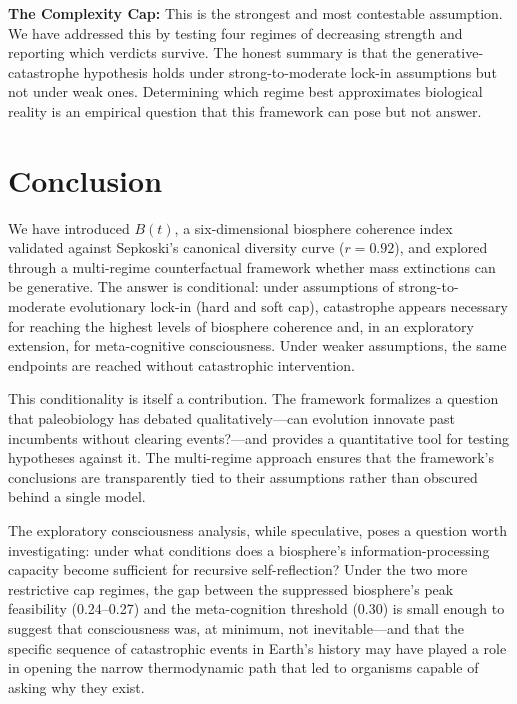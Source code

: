 \documentclass[10pt,letterpaper]{article}
\newcommand{\bt}{$B(t)$}
\begin{document}
\textbf{The Complexity Cap:} This is the strongest and most contestable
assumption. We have addressed this by testing four regimes of decreasing
strength and reporting which verdicts survive. The honest summary is that
the generative-catastrophe hypothesis holds under strong-to-moderate lock-in
assumptions but not under weak ones. Determining which regime best
approximates biological reality is an empirical question that this
framework can pose but not answer.

\section*{Conclusion}

We have introduced \bt{}, a six-dimensional biosphere coherence index validated
against Sepkoski's canonical diversity curve ($r = 0.92$), and explored
through a multi-regime counterfactual framework whether mass extinctions can
be generative. The answer is conditional: under assumptions of strong-to-moderate
evolutionary lock-in (hard and soft cap), catastrophe appears necessary for
reaching the highest levels of biosphere coherence and, in an exploratory
extension, for meta-cognitive consciousness. Under weaker assumptions,
the same endpoints are reached without catastrophic intervention.

This conditionality is itself a contribution. The framework formalizes
a question that paleobiology has debated qualitatively---can evolution
innovate past incumbents without clearing events?---and provides a
quantitative tool for testing hypotheses against it. The multi-regime
approach ensures that the framework's conclusions are transparently
tied to their assumptions rather than obscured behind a single model.

The exploratory consciousness analysis, while speculative, poses a
question worth investigating: under what conditions does a biosphere's
information-processing capacity become sufficient for recursive
self-reflection? Under the two more restrictive cap regimes, the gap
between the suppressed biosphere's peak feasibility (0.24--0.27) and the
meta-cognition threshold (0.30) is small enough to suggest that consciousness
was, at minimum, not inevitable---and that the specific sequence of
catastrophic events in Earth's history may have played a role in opening
the narrow thermodynamic path that led to organisms capable of asking
why they exist.
\end{document}
